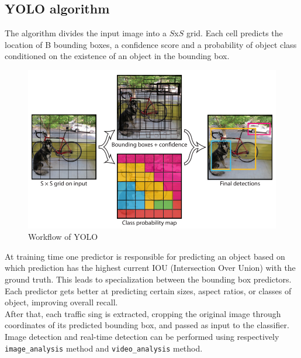 \documentclass[10pt,twocolumn,letterpaper]{article}
\begin{document}
\subsection{YOLO algorithm}
The algorithm divides the input image into a $S$x$S$ grid. Each cell predicts the location of B bounding boxes, a confidence score and a probability of object class conditioned on the existence of an object in the bounding box. 
\begin{figure}[h]
	\includegraphics[width=\linewidth]{Res/Immagini/yoloAlg.PNG}	
	\caption{Workflow of YOLO}
\end{figure}
At training time one predictor is responsible for predicting an object based on which prediction has the highest current IOU (Intersection Over Union) with the ground truth. This leads to specialization between the bounding box predictors. Each predictor gets better at predicting certain sizes, aspect ratios, or classes of object, improving overall recall.\\
After that, each traffic sing is extracted, cropping the original image through coordinates of its predicted bounding box, and passed as input to the classifier. Image detection and real-time detection can be performed using respectively \texttt{image\_analysis} method and \texttt{video\_analysis} method.
\end{document}
